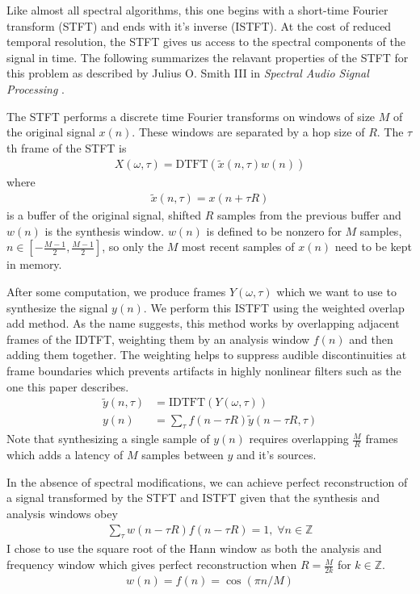 \documentclass[12pt]{article}
\begin{document}
Like almost all spectral algorithms, this one begins with a short-time Fourier transform (STFT) and ends with it's inverse (ISTFT).
At the cost of reduced temporal resolution, the STFT gives us access to the spectral components of the signal in time.
The following summarizes the relavant properties of the STFT for this problem as described by Julius O. Smith III in \emph{Spectral Audio Signal Processing} \cite{dsprelated}.

The STFT performs a discrete time Fourier transforms on windows of size $M$ of the original signal $x(n)$.
These windows are separated by a hop size of $R$. The $\tau$th frame of the STFT is
\begin{align}
  X(\omega, \tau) = 
  \text{DTFT}(\tilde{x}(n, \tau)w(n))
\end{align}
where
\begin{align}
  \tilde{x}(n,\tau) = x(n + \tau R)
\end{align}
is a buffer of the original signal, shifted $R$ samples from the previous buffer and $w(n)$ is the synthesis window.
$w(n)$ is defined to be nonzero for $M$ samples, 
$n\in\left[-\frac{M - 1}{2}, \frac{M - 1}{2}\right]$, so only the $M$ most recent samples of $x(n)$ need to be kept in memory.

After some computation, 
we produce frames $Y(\omega, \tau)$ 
which we want to use to synthesize the signal $y(n)$.
We perform this ISTFT using the weighted overlap add method.
As the name suggests, this method works by
overlapping adjacent frames of the IDTFT, 
weighting them by an analysis window $f(n)$ 
and then adding them together.
The weighting helps to suppress audible discontinuities at frame boundaries
which prevents artifacts in highly nonlinear filters such as the one this paper describes.
\begin{align}
  \tilde{y}(n,\tau) &= \text{IDTFT}(Y(\omega, \tau))
  \\
  y(n) &= \sum_\tau f(n - \tau R)\tilde{y}(n - \tau R,\tau)
\end{align}
Note that synthesizing a single sample of $y(n)$ requires overlapping
$\frac{M}{R}$ frames which adds a latency of $M$ samples between $y$ and it's sources.

In the absence of spectral modifications, 
we can achieve perfect reconstruction 
of a signal transformed by the STFT and ISTFT given
that the synthesis and analysis windows obey
\begin{align}
  \sum_\tau w(n - \tau R)f(n - \tau R) = 1,\; \forall n\in \mathbb{Z}
\end{align}
I chose to use the square root of the Hann window as both the analysis and frequency window
which gives perfect reconstruction when $R = \frac{M}{2k}$ for $k\in\mathbb{Z}$.
\begin{align}
  w(n) = 
  f(n) =
  \cos(\pi n / M)
\end{align}
\end{document}
